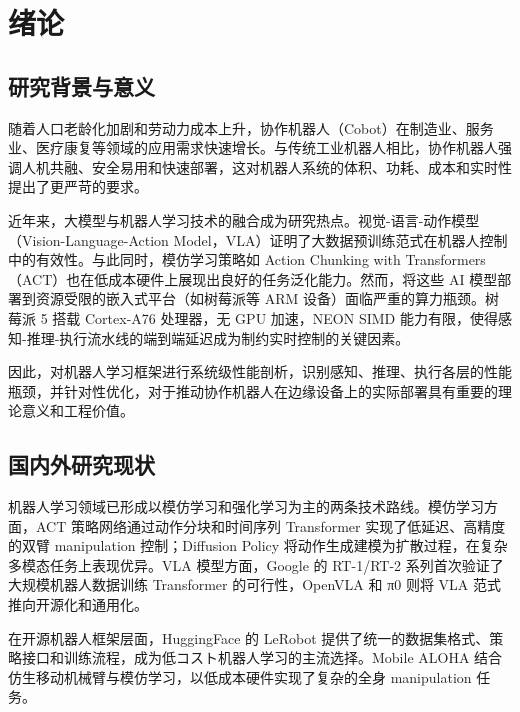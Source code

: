 
\chapter{绪论}

\label{chap:intro}


\section{研究背景与意义}

随着人口老龄化加剧和劳动力成本上升，协作机器人（Cobot）在制造业、服务业、医疗康复等领域的应用需求快速增长。与传统工业机器人相比，协作机器人强调人机共融、安全易用和快速部署，这对机器人系统的体积、功耗、成本和实时性提出了更严苛的要求。

近年来，大模型与机器人学习技术的融合成为研究热点。视觉-语言-动作模型（Vision-Language-Action Model，VLA）证明了大数据预训练范式在机器人控制中的有效性。与此同时，模仿学习策略如 Action Chunking with Transformers（ACT）也在低成本硬件上展现出良好的任务泛化能力。然而，将这些 AI 模型部署到资源受限的嵌入式平台（如树莓派等 ARM 设备）面临严重的算力瓶颈。树莓派 5 搭载 Cortex-A76 处理器，无 GPU 加速，NEON SIMD 能力有限，使得感知-推理-执行流水线的端到端延迟成为制约实时控制的关键因素。

因此，对机器人学习框架进行系统级性能剖析，识别感知、推理、执行各层的性能瓶颈，并针对性优化，对于推动协作机器人在边缘设备上的实际部署具有重要的理论意义和工程价值。


\section{国内外研究现状}

机器人学习领域已形成以模仿学习和强化学习为主的两条技术路线。模仿学习方面，ACT 策略网络通过动作分块和时间序列 Transformer 实现了低延迟、高精度的双臂 manipulation 控制；Diffusion Policy 将动作生成建模为扩散过程，在复杂多模态任务上表现优异。VLA 模型方面，Google 的 RT-1/RT-2 系列首次验证了大规模机器人数据训练 Transformer 的可行性，OpenVLA 和 π0 则将 VLA 范式推向开源化和通用化。

在开源机器人框架层面，HuggingFace 的 LeRobot 提供了统一的数据集格式、策略接口和训练流程，成为低コスト机器人学习的主流选择。Mobile ALOHA 结合仿生移动机械臂与模仿学习，以低成本硬件实现了复杂的全身 manipulation 任务。


